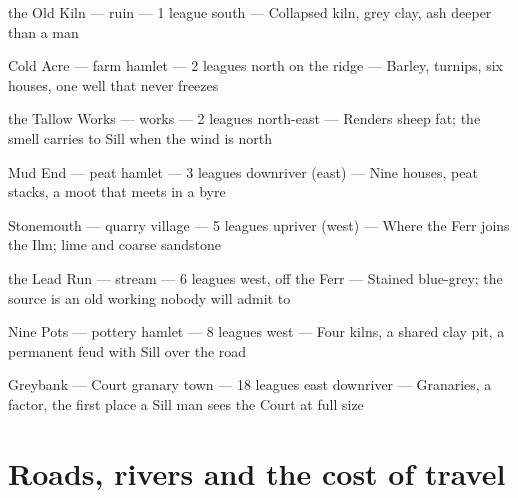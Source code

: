 \documentclass{design/chronicle}
\begin{document}
the Old Kiln — ruin — 1 league south — Collapsed kiln, grey clay, ash deeper than a man\par

Cold Acre — farm hamlet — 2 leagues north on the ridge — Barley, turnips, six houses, one well that never freezes\par

the Tallow Works — works — 2 leagues north-east — Renders sheep fat; the smell carries to Sill when the wind is north\par

Mud End — peat hamlet — 3 leagues downriver (east) — Nine houses, peat stacks, a moot that meets in a byre\par

Stonemouth — quarry village — 5 leagues upriver (west) — Where the Ferr joins the Ilm; lime and coarse sandstone\par

the Lead Run — stream — 6 leagues west, off the Ferr — Stained blue-grey; the source is an old working nobody will admit to\par

Nine Pots — pottery hamlet — 8 leagues west — Four kilns, a shared clay pit, a permanent feud with Sill over the road\par

Greybank — Court granary town — 18 leagues east downriver — Granaries, a factor, the first place a Sill man sees the Court at full size\par

\section*{Roads, rivers and the cost of travel}
\end{document}
